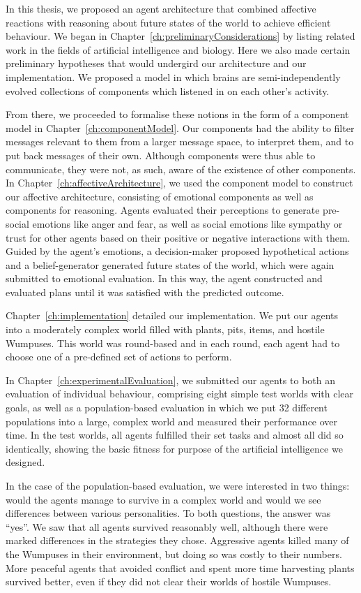 In this thesis, we proposed an agent architecture that combined affective reactions with reasoning about future states of the world to achieve efficient behaviour. We began in Chapter~\ref{ch:preliminaryConsiderations} by listing related work in the fields of artificial intelligence and biology. Here we also made certain preliminary hypotheses that would undergird our architecture and our implementation. We proposed a model in which brains are semi-independently evolved collections of components which listened in on each other's activity.

From there, we proceeded to formalise these notions in the form of a component model in Chapter~\ref{ch:componentModel}. Our components had the ability to filter messages relevant to them from a larger message space, to interpret them, and to put back messages of their own. Although components were thus able to communicate, they were not, as such, aware of the existence of other components. In Chapter~\ref{ch:affectiveArchitecture}, we used the component model to construct our affective architecture, consisting of emotional components as well as components for reasoning. Agents evaluated their perceptions to generate pre-social emotions like anger and fear, as well as social emotions like sympathy or trust for other agents based on their positive or negative interactions with them. Guided by the agent's emotions, a decision-maker proposed hypothetical actions and a belief-generator generated future states of the world, which were again submitted to emotional evaluation. In this way, the agent constructed and evaluated plans until it was satisfied with the predicted outcome.

Chapter~\ref{ch:implementation} detailed our implementation. We put our agents into a moderately complex world filled with plants, pits, items, and hostile Wumpuses. This world was round-based and in each round, each agent had to choose one of a pre-defined set of actions to perform.

In Chapter~\ref{ch:experimentalEvaluation}, we submitted our agents to both an evaluation of individual behaviour, comprising eight simple test worlds with clear goals, as well as a population-based evaluation in which we put 32 different populations into a large, complex world and measured their performance over time. In the test worlds, all agents fulfilled their set tasks and almost all did so identically, showing the basic fitness for purpose of the artificial intelligence we designed.

In the case of the population-based evaluation, we were interested in two things: would the agents manage to survive in a complex world and would we see differences between various personalities. To both questions, the answer was ``yes''. We saw that all agents survived reasonably well, although there were marked differences in the strategies they chose. Aggressive agents killed many of the Wumpuses in their environment, but doing so was costly to their numbers. More peaceful agents that avoided conflict and spent more time harvesting plants survived better, even if they did not clear their worlds of hostile Wumpuses.

